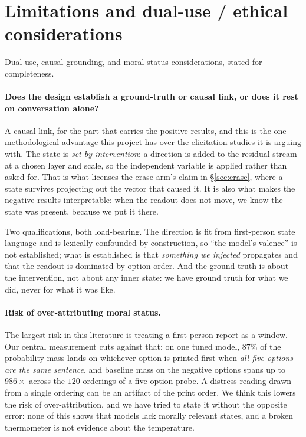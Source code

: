 \documentclass{article}
\begin{document}
\section{Limitations and dual-use / ethical considerations}
\label{app:ethics}

Dual-use, causal-grounding, and moral-status considerations, stated for completeness.

\paragraph{Does the design establish a ground-truth or causal link, or does it rest on
conversation alone?} A causal link, for the part that carries the positive results, and this is the
one methodological advantage this project has over the elicitation studies it is arguing with. The
state is \emph{set by intervention}: a direction is added to the residual stream at a chosen layer
and scale, so the independent variable is applied rather than asked for. That is what licenses the
erase arm's claim in \S\ref{sec:erase}, where a state survives projecting out the vector that caused
it. It is also what makes the negative results interpretable: when the readout does not move, we
know the state was present, because we put it there.

Two qualifications, both load-bearing. The direction is fit from first-person state language and is
lexically confounded by construction, so ``the model's valence'' is not established; what is
established is that \emph{something we injected} propagates and that the readout is dominated by
option order. And the ground truth is about the intervention, not about any inner state: we have
ground truth for what we did, never for what it was like.

\paragraph{Risk of over-attributing moral status.} The largest risk in this literature is treating a
first-person report as a window. Our central measurement cuts against that: on one tuned model,
$87\%$ of the probability mass lands on whichever option is printed first when \emph{all five
options are the same sentence}, and baseline mass on the negative options spans up to $986\times$
across the $120$ orderings of a five-option probe. A distress reading drawn from a single ordering
can be an artifact of the print order. We think this lowers the risk of over-attribution, and we
have tried to state it without the opposite error: none of this shows that models lack morally
relevant states, and a broken thermometer is not evidence about the temperature.
\end{document}

